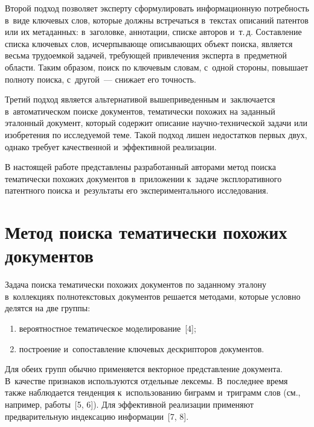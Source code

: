 \begin{multicols}{2}
  Второй подход позволяет эксперту сформулировать информационную 
потребность в~виде ключевых слов, которые должны встречаться в~текстах 
описаний патентов или их метаданных: в~заголовке, аннотации, списке авторов и~т.\,д. 
Составление списка ключевых слов, исчерпывающе опи\-сы\-ва\-ющих объект 
поиска, является весьма трудоемкой задачей, требующей привлечения эксперта в~предметной области. Таким образом, поиск по ключевым словам, с~одной 
стороны, повышает полноту поиска, с~другой~--- снижает его точность.
  
  Третий подход является альтернативой вышеприведенным и~заключается 
в~автоматическом поиске документов, тематически похожих на за\-данный 
эталонный документ, который содержит описа\-ние на\-уч\-но-тех\-ни\-че\-ской 
задачи или изобретения по исследуемой теме. Такой подход лишен недостатков 
первых двух, однако требует качественной и~эффективной реализации.
  
  В настоящей работе представлены разработанный авторами метод поиска 
тематически похожих документов в~приложении к~задаче эксплоративного 
патентного поиска и~результаты его экспериментального исследования.

\vspace*{-9pt}
  
\section{Метод поиска тематически похожих документов}

\vspace*{-3pt}
     
  Задача поиска тематически похожих документов по заданному эталону 
в~коллекциях полнотекстовых документов решается методами, которые 
условно делятся на две группы:
  \begin{enumerate}[(1)]
  \item  вероятностное тематическое моделирование~[4];
    \item  построение и~сопоставление ключевых дескрипторов документов. 
    \end{enumerate}
    
  Для обеих групп обычно применяется векторное представление документа. 
В~качестве признаков используются  отдельные лексемы. В~последнее время 
также наблюдается тенденция к~использованию биграмм и~триграмм слов (см., 
например, работы~[5, 6]). Для эффективной реализации применяют 
предварительную индексацию информации~[7, 8].
  

\end{multicols}
